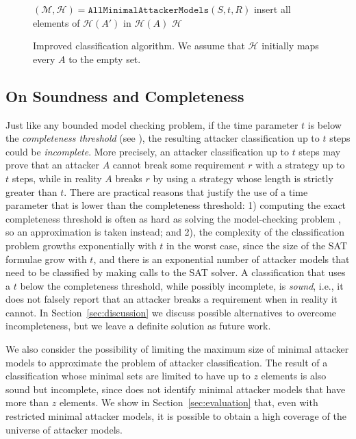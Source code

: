 {\begin{figure}[!t]
{\begin{algorithm}[H]
$(\mathcal{M},\mathcal{H})=\mathtt{AllMinimalAttackerModels}(S,t,R)$\;
{
	{
		{
			insert all elements of $\mathcal{H}(A')$ in $\mathcal{H}(A)$\;
		}
	 }
}
 \Return $\mathcal{H}$\;
 \caption{Improved classification algorithm. We assume that $\mathcal{H}$ initially maps every $A$ to the empty set.}
 \label{alg:GoodQuantification}
\end{algorithm}
}
\vspace{-0.5cm}
\end{figure}

\subsection{On Soundness and Completeness}
\label{sec:completeness}
Just like any bounded model checking problem, if the time parameter $t$ is below the \emph{completeness threshold} (see \cite{EfficientComputationOfRecurrenceDiameters}), the resulting attacker classification up to $t$ steps could be \emph{incomplete}. More precisely, an attacker classification up to $t$ steps may prove that an attacker $A$ cannot break some requirement $r$ with a strategy up to $t$ steps, while in reality $A$ breaks $r$ by using a strategy whose length is strictly greater than $t$. There are practical reasons that justify the use of a time parameter that is lower than the completeness threshold: 1) computing the exact completeness threshold is often as hard as solving the model-checking problem \cite{HandbookOfModelChecking}, so an approximation is taken instead; and 2), the complexity of the classification problem growths exponentially with $t$ in the worst case, since the size of the SAT formulae grow with $t$, and there is an exponential number of attacker models that need to be classified by making calls to the SAT solver. A classification that uses a $t$ below the completeness threshold, while possibly incomplete, is \emph{sound}, i.e., it does not falsely report that an attacker breaks a requirement when in reality it cannot. In Section~\ref{sec:discussion} we discuss possible alternatives to overcome incompleteness, but we leave a definite solution as future work.

We also consider the possibility of limiting the maximum size of minimal attacker models to approximate the problem of attacker classification. The result of a classification whose minimal sets are limited to have up to $z$ elements is also sound but incomplete, since does not identify minimal attacker models that have more than $z$ elements. We show in Section~\ref{sec:evaluation} that, even with restricted minimal attacker models, it is possible to obtain a high coverage of the universe of attacker models.
 
}
